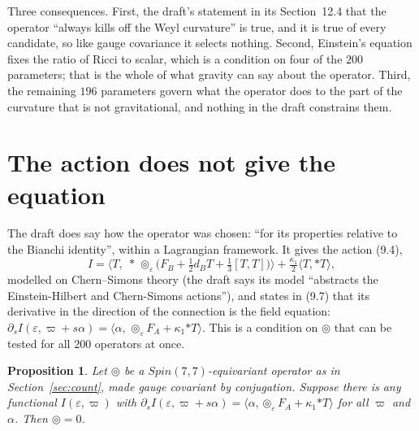 \documentclass[11pt]{article}
\newtheorem{proposition}[theorem]{Proposition}
\theoremstyle{remark}
\newcommand{\vp}{\varpi}
\newcommand{\eps}{\varepsilon}
\newcommand{\Sh}{\circledcirc}
\begin{document}
Three consequences. First, the draft's statement in its Section~12.4 that the operator ``always
kills off the Weyl curvature'' is true, and it is true of every candidate, so like gauge covariance it selects
nothing. Second, Einstein's equation fixes the ratio of Ricci to scalar, which is a condition
on four of the $200$ parameters; that is the whole of what gravity can say about the operator.
Third, the remaining $196$ parameters govern what the operator does to the part of the
curvature that is not gravitational, and nothing in the draft constrains them.

\section{The action does not give the equation}\label{sec:action}

The draft does say how the operator was chosen: ``for its properties relative to the Bianchi
identity'', within a Lagrangian framework. It gives the action (9.4),
\[
I=\bigl\langle T,\;*\,\Sh_\eps\bigl(F_B+\tfrac12 d_BT+\tfrac13[T,T]\bigr)\bigr\rangle
+\tfrac{\kappa_1}{2}\langle T,*T\rangle ,
\]
modelled on Chern--Simons theory \cite{CS,Witten} (the draft says its model ``abstracts the
Einstein-Hilbert and Chern-Simons actions''), and states in (9.7) that its derivative in the direction of
the connection is the field equation: $\partial_s I(\eps,\vp+s\alpha)=\langle\alpha,\,
\Sh_\eps F_A+\kappa_1{*T}\rangle$. This is a condition on $\Sh$ that can be tested for all
$200$ operators at once.

\begin{proposition}\label{prop:action}
Let $\Sh$ be a $Spin(7,7)$-equivariant operator as in Section~\ref{sec:count}, made gauge
covariant by conjugation. Suppose there is any functional $I(\eps,\vp)$ with
$\partial_sI(\eps,\vp+s\alpha)=\langle\alpha,\Sh_\eps F_A+\kappa_1{*T}\rangle$ for all
$\vp$ and $\alpha$. Then $\Sh=0$.
\end{proposition}
\end{document}
